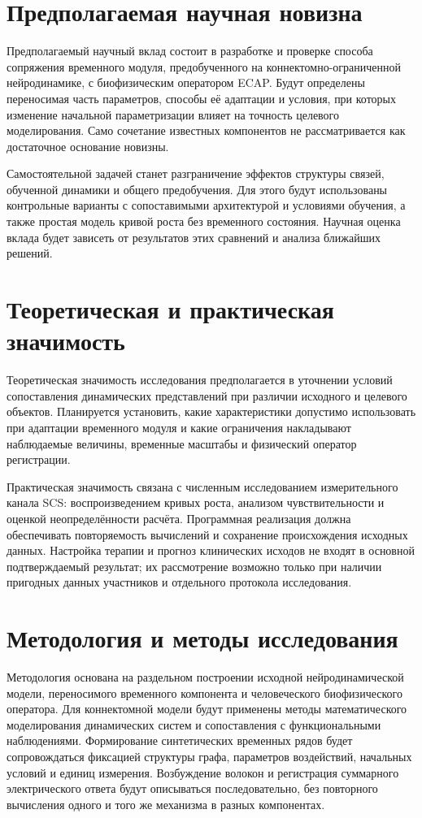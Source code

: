 \section*{Предполагаемая научная новизна}
Предполагаемый научный вклад состоит в разработке и проверке способа сопряжения временного модуля, предобученного на коннектомно-ограниченной нейродинамике, с биофизическим оператором ECAP. Будут определены переносимая часть параметров, способы её адаптации и условия, при которых изменение начальной параметризации влияет на точность целевого моделирования. Само сочетание известных компонентов не рассматривается как достаточное основание новизны.

Самостоятельной задачей станет разграничение эффектов структуры связей, обученной динамики и общего предобучения. Для этого будут использованы контрольные варианты с сопоставимыми архитектурой и условиями обучения, а также простая модель кривой роста без временного состояния. Научная оценка вклада будет зависеть от результатов этих сравнений и анализа ближайших решений.

\section*{Теоретическая и практическая значимость}
Теоретическая значимость исследования предполагается в уточнении условий сопоставления динамических представлений при различии исходного и целевого объектов. Планируется установить, какие характеристики допустимо использовать при адаптации временного модуля и какие ограничения накладывают наблюдаемые величины, временные масштабы и физический оператор регистрации.

Практическая значимость связана с численным исследованием измерительного канала SCS: воспроизведением кривых роста, анализом чувствительности и оценкой неопределённости расчёта. Программная реализация должна обеспечивать повторяемость вычислений и сохранение происхождения исходных данных. Настройка терапии и прогноз клинических исходов не входят в основной подтверждаемый результат; их рассмотрение возможно только при наличии пригодных данных участников и отдельного протокола исследования.

\section*{Методология и методы исследования}
Методология основана на раздельном построении исходной нейродинамической модели, переносимого временного компонента и человеческого биофизического оператора. Для коннектомной модели будут применены методы математического моделирования динамических систем и сопоставления с функциональными наблюдениями. Формирование синтетических временных рядов будет сопровождаться фиксацией структуры графа, параметров воздействий, начальных условий и единиц измерения. Возбуждение волокон и регистрация суммарного электрического ответа будут описываться последовательно, без повторного вычисления одного и того же механизма в разных компонентах.

